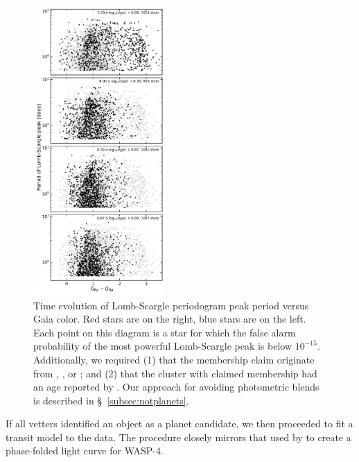 \documentclass[12pt,twocolumn,tighten]{aastex62}
\begin{document}
\begin{figure}[!t]
	\begin{center}
		\leavevmode
		\includegraphics[width=0.45\textwidth]{LS_period_vs_color_and_age.png}
	\end{center}
	\vspace{-0.2cm}
	\caption{
    Time evolution of Lomb-Scargle periodogram peak period versus Gaia
    color.
		Red stars are on the right, blue stars are on the left.
		Each point on this diagram is a star for which the false alarm
		probability of the most powerful Lomb-Scargle peak is below
		$10^{-15}$.
		Additionally, we required (1) that the membership claim originate
		from \citet{cantat-gaudin_gaia_2018},
		\citet{Kharchenko_et_al_2013}, or \citet{gaia_hr_2018}; and (2)
		that the cluster with claimed membership had an age reported by
		\citet{Kharchenko_et_al_2013}.
		Our approach for avoiding photometric blends is described in
		\S~\ref{subsec:notplanets}.
		\label{fig:ls_peak_vs_time}
	}
\end{figure}


If all vetters identified an object as a planet candidate, we then
proceeded to fit a transit model to the data.  The procedure closely
mirrors that used by \citet{bouma_wasp-4b_2019} to create a
phase-folded light curve for WASP-4.
\end{document}
